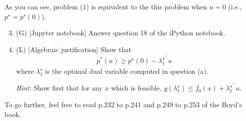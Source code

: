 As you can see, problem (1) is equivalent to the this problem when $u=0$ (i.e., $p^\star = p^\star(0)$).

\begin{enumerate}
    \setcounter{enumi}{2}
    \item (G) [Jupyter notebook] Answer question 18 of the iPython notebook.
    
    \sol{}
    
    \item (L) [Algebraic justification] Show that
    \begin{align*}
        p^\ast(u) \geq p^\star(0) -  \lambda_1^{\star^\top} u
    \end{align*}
    where $\lambda_1^\star$ is the optimal dual variable computed in question (a).
    
    \textit{Hint:} Show first that for any $x$ which is feasible, $g(\lambda_1^\star) \leq f_0(x) + \lambda_1^{\star^\top} u$.
    
    \sol{}
\end{enumerate}

To go further, feel free to read p.232 to p.241 and p.249 to p.253 of the Boyd's book.